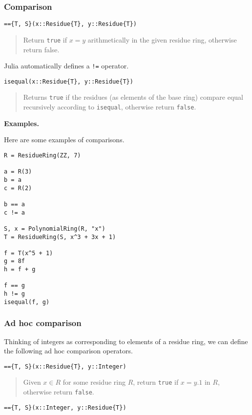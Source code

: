 \documentclass[a4paper,10pt]{article}
\newcommand{\code}{\lstinline}
\newcommand{\desc}[1]{\vspace{-3mm}\begin{quote}#1\end{quote}}
\begin{document}
\subsubsection{Comparison}

\begin{lstlisting}
=={T, S}(x::Residue{T}, y::Residue{T})
\end{lstlisting}

\desc{Return \code{true} if $x = y$ arithmetically in the given residue ring, 
otherwise return false.}

Julia automatically defines a \code{!=} operator.

\begin{lstlisting}
isequal(x::Residue{T}, y::Residue{T})
\end{lstlisting}

\desc{Returns \code{true} if the residues (as elements of the base ring) compare
equal recursively according to \code{isequal}, otherwise return \code{false}.}

\textbf{Examples.}

Here are some examples of comparisons.

\begin{lstlisting}
R = ResidueRing(ZZ, 7)

a = R(3)
b = a
c = R(2)

b == a
c != a

S, x = PolynomialRing(R, "x")
T = ResidueRing(S, x^3 + 3x + 1)

f = T(x^5 + 1)
g = 8f
h = f + g

f == g
h != g
isequal(f, g)
\end{lstlisting}

\subsubsection{Ad hoc comparison}

Thinking of integers as corresponding to elements of a residue ring, we
can define the following ad hoc comparison operators.

\begin{lstlisting}
=={T, S}(x::Residue{T}, y::Integer)
\end{lstlisting}

\desc{Given $x \in R$ for some residue ring $R$, return \code{true} 
if $x = y.1$ in $R$, otherwise return \code{false}.}

\begin{lstlisting}
=={T, S}(x::Integer, y::Residue{T})
\end{lstlisting}
\end{document}
